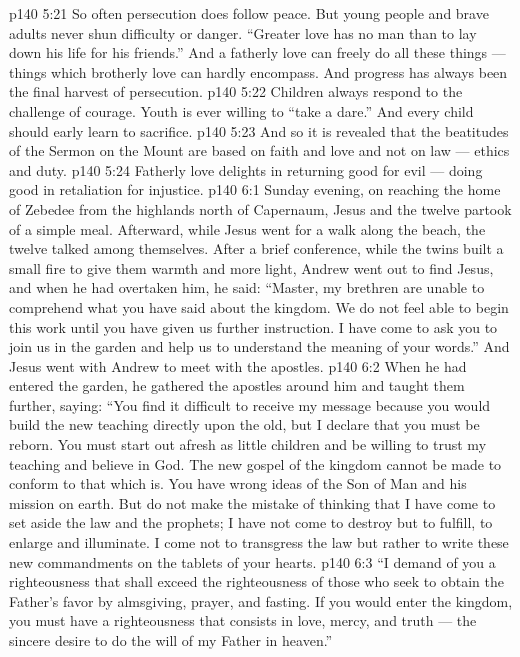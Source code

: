 \vs p140 5:21 So often persecution does follow peace. But young people and brave adults never shun difficulty or danger. \textcolor{ubdarkred}{“Greater love has no man than to lay down his life for his friends.”} And a fatherly love can freely do all these things --- things which brotherly love can hardly encompass. And progress has always been the final harvest of persecution.
\vs p140 5:22 Children always respond to the challenge of courage. Youth is ever willing to “take a dare.” And every child should early learn to sacrifice.
\vs p140 5:23 \pc And so it is revealed that the beatitudes of the Sermon on the Mount are based on faith and love and not on law --- ethics and duty.
\vs p140 5:24 \pc Fatherly love delights in returning good for evil --- doing good in retaliation for injustice.
\vs p140 6:1 Sunday evening, on reaching the home of Zebedee from the highlands north of Capernaum, Jesus and the twelve partook of a simple meal. Afterward, while Jesus went for a walk along the beach, the twelve talked among themselves. After a brief conference, while the twins built a small fire to give them warmth and more light, Andrew went out to find Jesus, and when he had overtaken him, he said: “Master, my brethren are unable to comprehend what you have said about the kingdom. We do not feel able to begin this work until you have given us further instruction. I have come to ask you to join us in the garden and help us to understand the meaning of your words.” And Jesus went with Andrew to meet with the apostles.
\vs p140 6:2 When he had entered the garden, he gathered the apostles around him and taught them further, saying: \textcolor{ubdarkred}{“You find it difficult to receive my message because you would build the new teaching directly upon the old, but I declare that you must be reborn. You must start out afresh as little children and be willing to trust my teaching and believe in God. The new gospel of the kingdom cannot be made to conform to that which is. You have wrong ideas of the Son of Man and his mission on earth. But do not make the mistake of thinking that I have come to set aside the law and the prophets; I have not come to destroy but to fulfill, to enlarge and illuminate. I come not to transgress the law but rather to write these new commandments on the tablets of your hearts.}
\vs p140 6:3 \textcolor{ubdarkred}{“I demand of you a righteousness that shall exceed the righteousness of those who seek to obtain the Father’s favor by almsgiving, prayer, and fasting. If you would enter the kingdom, you must have a righteousness that consists in love, mercy, and truth --- the sincere desire to do the will of my Father in heaven.”}
